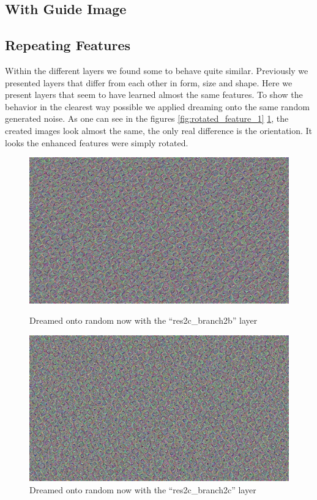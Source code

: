 \subsection{With Guide Image}
\label{sec:withguide}

\subsection{Repeating Features}
\label{sec:repeating-features}

Within the different layers we found some to behave quite similar.
Previously we presented layers that differ from each other in form, size and shape.
Here we present layers that seem to have learned almost the same features.
To show the behavior in the clearest way possible we applied dreaming onto the same random generated noise.
As one can see in the figures \ref{fig:rotated_feature_1} \ref{fig:rotated_feature_2}, the created images look almost the same, the only real difference is the orientation.
It looks the enhanced features were simply rotated.

\begin{figure}[H]
	\centering
	\includegraphics[width=1\linewidth]{img/rotated_feature_1.jpg}
	\caption{Dreamed onto random now with the \enquote{res2c\_branch2b} layer}
	\label{fig:rotated_feature_1}
	\endminipage\hfill
	\centering
	\includegraphics[width=1\linewidth]{img/rotated_feature_2.jpg}
	\caption{Dreamed onto random now with the \enquote{res2c\_branch2c} layer}
	\label{fig:rotated_feature_2}
	\endminipage\hfill
\end{figure}


